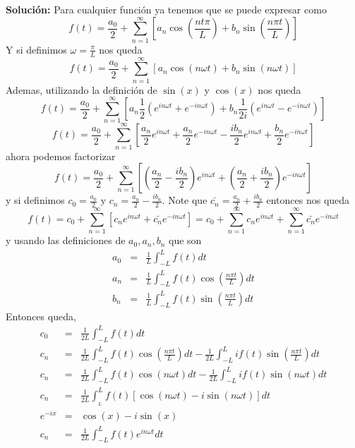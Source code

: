 \documentclass[12pt]{exam}
\begin{document}
\begin{enumerate}
    \textbf{Solución: } Para cualquier función ya tenemos que se puede expresar como $$f(t)=\frac{a_{0}}{2}+\sum_{n=1}^\infty \left[a_n\cos\left(\frac{nt\pi}{L} \right)+ b_{n} \sin\left(\frac{n\pi t}{L}\right)\right]$$
    Y si definimos $\omega = \frac{\pi}{L}$ nos queda $$f(t) = \frac{a_0}{2}+\sum_{n=1}^{\infty}[a_n\cos(n\omega t)+b_n \sin(n\omega t)]$$ Ademas, utilizando la definición
    de $\sin(x)$ y $\cos(x)$ nos queda $$f(t)=\frac{a_0}{2}+\sum_{n=1}^\infty\left[a_n \frac{1}{2}(e^{in\omega t}+e^{-in\omega t})+b_n\frac{1}{2i}(e^{in\omega t}-e^{-in\omega t})\right]$$
    $$f(t) = \frac{a_0}{2} + \sum_{n=1}^{\infty}\left[\frac{a_n}{2}e^{in\omega t}+\frac{a_n}{2}e^{-in\omega t}-\frac{ib_n}{2}e^{in\omega t} + \frac{b_n}{2}e^{-in\omega t}\right]$$
    ahora podemos factorizar $$f(t) = \frac{a_0}{2}+\sum_{n=1}^\infty \left[\left(\frac{a_n}{2}-\frac{ib_n}{2}\right)e^{in\omega t}+\left(\frac{a_n}{2}+\frac{ib_n}{2}\right)e^{-in\omega t}\right]$$
    y si definimos $c_0 = \frac{a_0}{2}$ y $c_n = \frac{a_n}{2}-\frac{ib_n}{2}$. Note que $\bar{c_n} = \frac{a_n}{2}+\frac{ib_n}{2}$
    entonces nos queda $$f(t) = c_0 + \sum_{n=1}^\infty[c_ne^{in\omega t}+\bar{c_n}e^{-in\omega t}]=c_0 + \sum_{n=1}^{\infty}c_n e^{in\omega t}+\sum_{n=1}^{\infty}\bar{c_n}e^{-in\omega t}$$
    y usando las definiciones de $a_0, a_n, b_n$ que son
    \begin{eqnarray*}
        a_0 &=& \frac{1}{L}\int_{-L}^{L}f(t)dt\\
        a_n &=& \frac{1}{L}\int_{-L}^{L}f(t)\cos\left(\frac{n\pi t}{L}\right)dt\\
        b_n &=& \frac{1}{L}\int_{-L}^{L}f(t)\sin\left(\frac{n\pi t}{L}\right)dt
    \end{eqnarray*}
    Entonces queda, 
    \begin{eqnarray*}
        c_0 &=& \frac{1}{2L}\int_{-L}^{L}f(t)dt\\
        c_n &=& \frac{1}{2L}\int_{-L}^{L}f(t)\cos\left(\frac{n\pi t}{L}\right)dt-\frac{1}{2L}\int_{-L}^{L}if(t)\sin\left(\frac{n\pi t}{L}\right)dt\\
        c_n &=& \frac{1}{2L}\int_{-L}^{L}f(t)\cos\left(n\omega t\right)dt-\frac{1}{2L}\int_{-L}^{L}if(t)\sin\left(n\omega t\right)dt\\
        c_n &=& \frac{1}{2L}\int_{_L}^{L}f(t)[\cos(n\omega t)-i\sin(n\omega t)]dt\\
        e^{-ix} &=& \cos(x)-i\sin(x)\\
        c_n &=& \frac{1}{2L}\int_{-L}^{L}f(t)e^{in\omega t}dt
    \end{eqnarray*}

\end{enumerate}
\end{document}
